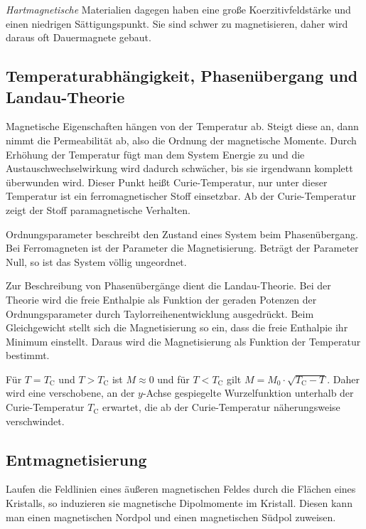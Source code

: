 \documentclass[12pt,a4paper]{scrartcl}
\numberwithin{equation}{section} %
\renewcommand{\[}{} %
\renewcommand{\]}{\noindent} %
\begin{document}
\emph{Hartmagnetische} Materialien dagegen haben eine große Koerzitivfeldstärke und einen niedrigen Sättigungspunkt. Sie sind schwer zu magnetisieren, daher wird daraus oft Dauermagnete gebaut.

\hypertarget{temperaturabhuxe4ngigkeit-phasenuxfcbergang-und-landau-theorie}{%
\subsection{Temperaturabhängigkeit, Phasenübergang und Landau-Theorie}\label{temperaturabhuxe4ngigkeit-phasenuxfcbergang-und-landau-theorie}}
Magnetische Eigenschaften hängen von der Temperatur ab. Steigt diese an, dann nimmt die Permeabilität ab, also die Ordnung der magnetische Momente. Durch Erhöhung der Temperatur fügt man dem System Energie zu und die Austauschwechselwirkung wird dadurch schwächer, bis sie irgendwann komplett überwunden wird. Dieser Punkt heißt Curie-Temperatur, nur unter dieser Temperatur ist ein ferromagnetischer Stoff einsetzbar. Ab der Curie-Temperatur zeigt der Stoff paramagnetische Verhalten.

Ordnungsparameter beschreibt den Zustand eines System beim Phasenübergang. Bei Ferromagneten ist der Parameter die Magnetisierung. Beträgt der Parameter Null, so ist das System völlig ungeordnet.

Zur Beschreibung von Phasenübergänge dient die Landau-Theorie. Bei der Theorie wird die freie Enthalpie als Funktion der geraden Potenzen der Ordnungsparameter durch Taylorreihenentwicklung ausgedrückt. Beim Gleichgewicht stellt sich die Magnetisierung so ein, dass die freie Enthalpie ihr Minimum einstellt. Daraus wird die Magnetisierung als Funktion der Temperatur bestimmt.

Für \(T=T_\mathrm{C}\) und \(T > T_\mathrm{C}\) ist \(M\approx 0\) und für \(T < T_\mathrm{C}\) gilt \(M = M_0 \cdot \sqrt{T_\mathrm{C} - T}\). Daher wird eine verschobene, an der \(y\)-Achse gespiegelte Wurzelfunktion unterhalb der Curie-Temperatur \(T_\mathrm{C}\) erwartet, die ab der Curie-Temperatur näherungsweise verschwindet.

\hypertarget{entmagnetisierung}{%
\subsection{Entmagnetisierung}\label{entmagnetisierung}}

Laufen die Feldlinien eines äußeren magnetischen Feldes durch die Flächen eines Kristalls, so induzieren sie magnetische Dipolmomente im Kristall. Diesen kann man einen magnetischen Nordpol und einen magnetischen Südpol zuweisen.
\end{document}
